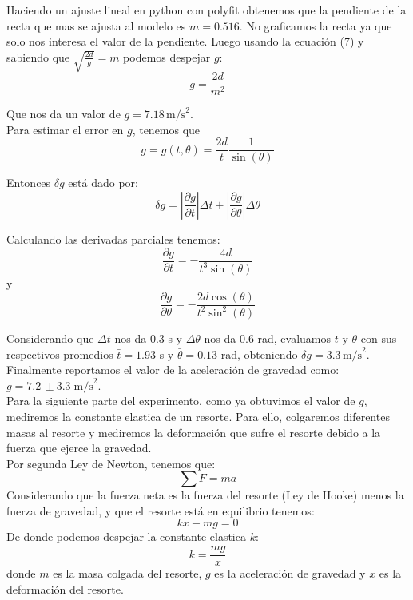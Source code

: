 \documentclass{article}
\begin{document}
Haciendo un ajuste lineal en python con polyfit obtenemos que la pendiente 
de la recta que mas se ajusta al modelo es $m = 0.516$. No graficamos la
recta ya que solo nos interesa el valor de la pendiente. Luego usando la 
ecuación (7) y sabiendo que $\sqrt{\frac{2d}{g}} = m$ podemos despejar $g$:
\begin{equation}
   g = \dfrac{2d}{m^2}
\end{equation}

Que nos da un valor de $g = 7.18 \, \text{m/s}^2$. \\

Para estimar el error en $g$, tenemos que 
\begin{equation}
   g = g(t,\theta) = \dfrac{2d}{t} \dfrac{1}{\sin(\theta)}
\end{equation}

Entonces $\delta g$ está dado por:
\begin{equation}
   \delta g = \left| \dfrac{\partial g}{\partial t} 
   \right| \Delta t + \left| \dfrac{\partial g}{\partial \theta} \right| 
   \Delta \theta
\end{equation}

Calculando las derivadas parciales tenemos:
\begin{equation}
   \dfrac{\partial g}{\partial t} = -\dfrac{4d}{t^3 \sin(\theta)}
\end{equation}
y
\begin{equation}
   \dfrac{\partial g}{\partial \theta} = -\dfrac{2d \cos(\theta)}{t^2 \sin^2(\theta)}
\end{equation}

Considerando que $\Delta t$ nos da 0.3 s y $\Delta \theta$ nos da 0.6 rad,
evaluamos $t$ y $\theta$ con sus respectivos promedios $\bar{t} = 1.93$ s y
$\bar{\theta} = 0.13$ rad, obteniendo $\delta g = 3.3 \, \text{m/s}^2$. \\

Finalmente reportamos el valor de la aceleración de gravedad como: 
$g = 7.2 \, \pm 3.3 \; \text{m/s}^2$. \\

Para la siguiente parte del experimento, como ya obtuvimos el valor de $g$, 
mediremos la constante elastica de un resorte. Para ello, colgaremos 
diferentes masas al resorte y mediremos la deformación que sufre el resorte
debido a la fuerza que ejerce la gravedad. \\

Por segunda Ley de Newton, 
tenemos que:
\begin{equation}
   \sum F = ma
\end{equation}
Considerando que la fuerza neta es la fuerza del resorte (Ley de Hooke) 
menos la fuerza de gravedad, y que el resorte está en equilibrio tenemos:
\begin{equation}
   kx - mg = 0
\end{equation}
De donde podemos despejar la constante elastica $k$:
\begin{equation}
   k = \dfrac{mg}{x}
\end{equation}
donde $m$ es la masa colgada del resorte, $g$ es la aceleración de gravedad
y $x$ es la deformación del resorte. \\
\end{document}
